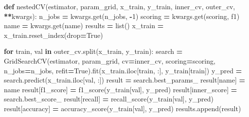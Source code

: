 \documentclass[
]{article}
\newenvironment{Shaded}{\begin{snugshade}}{\end{snugshade}}
\newcommand{\BuiltInTok}[1]{#1}
\newcommand{\ControlFlowTok}[1]{\textcolor[rgb]{0.13,0.29,0.53}{\textbf{#1}}}
\newcommand{\DecValTok}[1]{\textcolor[rgb]{0.00,0.00,0.81}{#1}}
\newcommand{\KeywordTok}[1]{\textcolor[rgb]{0.13,0.29,0.53}{\textbf{#1}}}
\newcommand{\NormalTok}[1]{#1}
\newcommand{\OperatorTok}[1]{\textcolor[rgb]{0.81,0.36,0.00}{\textbf{#1}}}
\newcommand{\StringTok}[1]{\textcolor[rgb]{0.31,0.60,0.02}{#1}}
\newcommand{\VariableTok}[1]{\textcolor[rgb]{0.00,0.00,0.00}{#1}}
\begin{document}
\begin{Shaded}
\begin{Highlighting}[]
\KeywordTok{def}\NormalTok{ nestedCV(estimator, param\_grid, x\_train, y\_train, inner\_cv, outer\_cv,}
             \OperatorTok{**}\NormalTok{kwargs):}
\NormalTok{    n\_jobs }\OperatorTok{=}\NormalTok{ kwargs.get(}\StringTok{\textquotesingle{}n\_jobs\textquotesingle{}}\NormalTok{, }\OperatorTok{{-}}\DecValTok{1}\NormalTok{)}
\NormalTok{    scoring }\OperatorTok{=}\NormalTok{ kwargs.get(}\StringTok{\textquotesingle{}scoring\textquotesingle{}}\NormalTok{, }\StringTok{\textquotesingle{}f1\textquotesingle{}}\NormalTok{)}
\NormalTok{    name }\OperatorTok{=}\NormalTok{ kwargs.get(}\StringTok{\textquotesingle{}name\textquotesingle{}}\NormalTok{)}
\NormalTok{    results }\OperatorTok{=} \BuiltInTok{list}\NormalTok{()}
\NormalTok{    x\_train }\OperatorTok{=}\NormalTok{ x\_train.reset\_index(drop}\OperatorTok{=}\VariableTok{True}\NormalTok{)}

    \ControlFlowTok{for}\NormalTok{ train, val }\KeywordTok{in}\NormalTok{ outer\_cv.split(x\_train, y\_train):}
\NormalTok{        search }\OperatorTok{=}\NormalTok{ GridSearchCV(estimator,}
\NormalTok{                              param\_grid,}
\NormalTok{                              cv}\OperatorTok{=}\NormalTok{inner\_cv,}
\NormalTok{                              scoring}\OperatorTok{=}\NormalTok{scoring,}
\NormalTok{                              n\_jobs}\OperatorTok{=}\NormalTok{n\_jobs,}
\NormalTok{                              refit}\OperatorTok{=}\VariableTok{True}\NormalTok{).fit(x\_train.iloc[train, :],}
\NormalTok{                                              y\_train[train])}
\NormalTok{        y\_pred }\OperatorTok{=}\NormalTok{ search.predict(x\_train.iloc[val, :])}
\NormalTok{        result }\OperatorTok{=}\NormalTok{ search.best\_params\_}
\NormalTok{        result[}\StringTok{\textquotesingle{}name\textquotesingle{}}\NormalTok{] }\OperatorTok{=}\NormalTok{ name}
\NormalTok{        result[}\StringTok{\textquotesingle{}f1\_score\textquotesingle{}}\NormalTok{] }\OperatorTok{=}\NormalTok{ f1\_score(y\_train[val], y\_pred)}
\NormalTok{        result[}\StringTok{\textquotesingle{}inner\_score\textquotesingle{}}\NormalTok{] }\OperatorTok{=}\NormalTok{ search.best\_score\_}
\NormalTok{        result[}\StringTok{\textquotesingle{}recall\textquotesingle{}}\NormalTok{] }\OperatorTok{=}\NormalTok{ recall\_score(y\_train[val], y\_pred)}
\NormalTok{        result[}\StringTok{\textquotesingle{}accuracy\textquotesingle{}}\NormalTok{] }\OperatorTok{=}\NormalTok{ accuracy\_score(y\_train[val], y\_pred)}
\NormalTok{        results.append(result)}


\end{Highlighting}
\end{Shaded}
\end{document}
